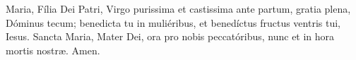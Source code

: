 Maria, Fília Dei Patri, Virgo purissima et castissima ante partum, gratia plena, Dóminus tecum; benedicta tu in muliéribus, 
et benedíctus fructus ventris tui, Iesus. Sancta Maria, Mater Dei, ora pro nobis peccatóribus, nunc et in hora mortis nostr{\ae}. Amen.
